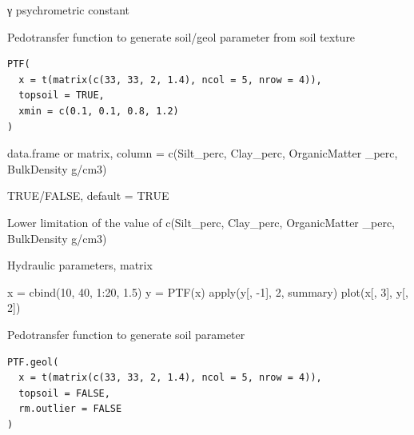 \documentclass[a4paper]{book}
\begin{document}
%
\begin{Value}
γ psychrometric constant 
\end{Value}
%
\begin{Description}\relax
Pedotransfer function to generate soil/geol parameter from soil texture
\end{Description}
%
\begin{Usage}
\begin{verbatim}
PTF(
  x = t(matrix(c(33, 33, 2, 1.4), ncol = 5, nrow = 4)),
  topsoil = TRUE,
  xmin = c(0.1, 0.1, 0.8, 1.2)
)
\end{verbatim}
\end{Usage}
%
\begin{Arguments}
\begin{ldescription}
\item[\code{x}] data.frame or matrix, column = c(Silt\_perc, Clay\_perc, OrganicMatter \_perc, BulkDensity g/cm3)

\item[\code{topsoil}] TRUE/FALSE, default = TRUE

\item[\code{xmin}] Lower limitation of the value of c(Silt\_perc, Clay\_perc, OrganicMatter \_perc, BulkDensity g/cm3)
\end{ldescription}
\end{Arguments}
%
\begin{Value}
Hydraulic parameters, matrix
\end{Value}
%
\begin{Examples}
\begin{ExampleCode}
x = cbind(10, 40, 1:20, 1.5)
y = PTF(x)
apply(y[, -1], 2, summary)
plot(x[, 3], y[, 2])
\end{ExampleCode}
\end{Examples}
%
\begin{Description}\relax
Pedotransfer function to generate soil parameter
\end{Description}
%
\begin{Usage}
\begin{verbatim}
PTF.geol(
  x = t(matrix(c(33, 33, 2, 1.4), ncol = 5, nrow = 4)),
  topsoil = FALSE,
  rm.outlier = FALSE
)
\end{verbatim}
\end{Usage}
\end{document}
